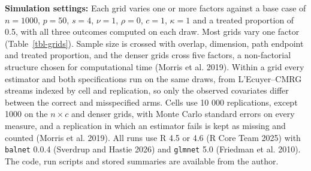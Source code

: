 \documentclass[
  12pt,
  a4paper,
]{article}
\begin{document}
\textbf{Simulation settings:} Each grid varies one or more factors
against a base case of \(n = 1000\), \(p = 50\), \(s = 4\), \(\nu = 1\),
\(\rho = 0\), \(c = 1\), \(\kappa = 1\) and a treated proportion of 0.5,
with all three outcomes computed on each draw. Most grids vary one
factor (Table~\ref{tbl-grids}). Sample size is crossed with overlap,
dimension, path endpoint and treated proportion, and the denser grids
cross five factors, a non-factorial structure chosen for computational
time (Morris et al. 2019). Within a grid every estimator and both
specifications run on the same draws, from L'Ecuyer--CMRG streams
indexed by cell and replication, so only the observed covariates differ
between the correct and misspecified arms. Cells use 10 000
replications, except 1000 on the \(n \times c\) and denser grids, with
Monte Carlo standard errors on every measure, and a replication in which
an estimator fails is kept as missing and counted (Morris et al. 2019).
All runs use R 4.5 or 4.6 (R Core Team 2025) with \texttt{balnet} 0.0.4
(Sverdrup and Hastie 2026) and \texttt{glmnet} 5.0 (Friedman et al.
2010). The code, run scripts and stored summaries are available from the
author.
\end{document}

